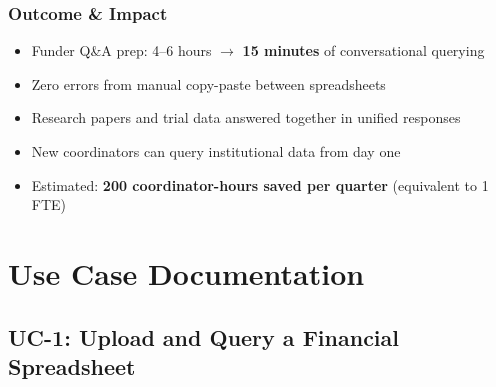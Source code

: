 \documentclass[12pt, a4paper, oneside]{report}
\begin{document}
\subsection*{Outcome \& Impact}
\begin{itemize}
  \item Funder Q\&A prep: 4--6 hours $\to$ \textbf{15 minutes} of conversational querying
  \item Zero errors from manual copy-paste between spreadsheets
  \item Research papers and trial data answered together in unified responses
  \item New coordinators can query institutional data from day one
  \item Estimated: \textbf{200 coordinator-hours saved per quarter} (equivalent to 1 FTE)
\end{itemize}

\chapter{Use Case Documentation}

\section{UC-1: Upload and Query a Financial Spreadsheet}
\end{document}
